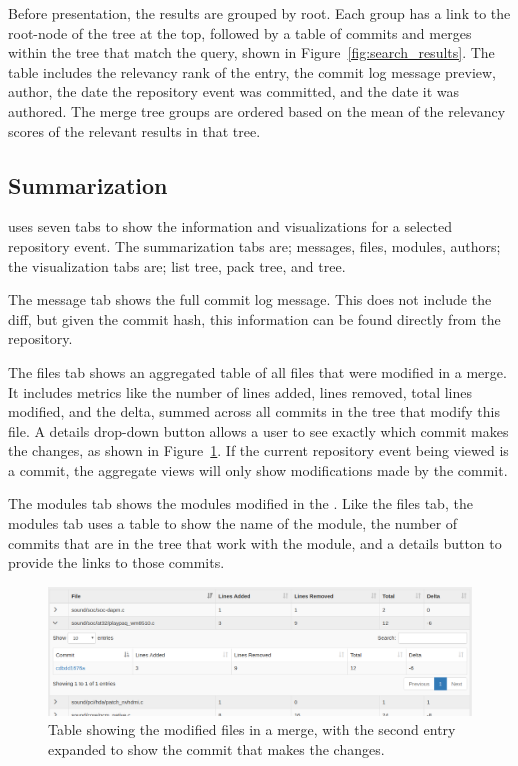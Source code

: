 Before presentation, the results are grouped by \mt root. Each group
has a link to the root-node of the tree at the top, followed by a table
of commits and merges within the tree that match the query, shown in
Figure~\ref{fig:search_results}. The table includes the relevancy rank
of the entry, the commit log message preview, author, the date the
repository event was committed, and the date it was authored. The merge
tree groups are ordered based on the mean of the relevancy scores of the
relevant results in that tree.

\subsection{Summarization}
\label{sub:summarization}

\tool uses seven tabs to show the information and visualizations for a
selected repository event. The summarization tabs are; messages, files, modules,
authors; the visualization tabs are; list tree, pack tree, and \rt tree.

The message tab shows the full commit log message. This does not include
the diff, but given the commit hash, this information can be found
directly from the repository.

The files tab shows an aggregated table of all files that were modified
in a merge. It includes metrics like the number of lines added, lines
removed, total lines modified, and the delta, summed across all commits
in the \mt tree that modify this file. A details drop-down button
allows a user to see exactly which commit makes the changes, as shown in
Figure~\ref{fig:linvis_files}. If the current repository event being
viewed is a commit, the aggregate views will only show modifications
made by the commit.

The modules tab shows the modules modified in the \mt. Like the
files tab, the modules tab uses a table to show the name of the module,
the number of commits that are in the \mt tree that work with the
module, and a details button to provide the links to those commits.

\begin{figure}[htpb]
  \centering
  \includegraphics[width=\linewidth]{figures/linvis/linvis_files.png}
  \caption{Table showing the modified files in a merge, with the second
  entry expanded to show the commit that makes the changes.}
  \label{fig:linvis_files}
\end{figure}

